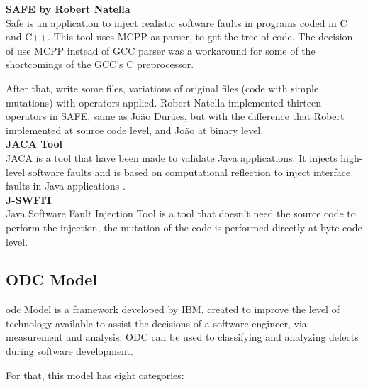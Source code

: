 \textbf{SAFE by Robert Natella}\\

Safe is an application to inject realistic software faults in programs coded in C and C++.
This tool uses MCPP as parser, to get the tree of code. The decision of use MCPP instead of GCC parser was a workaround for some of the shortcomings of the GCC's C preprocessor.

After that, write some files, variations of original files (code with simple mutations) with operators applied.
Robert Natella implemented thirteen operators in SAFE, same as João Durães\cite{duraes2006emulation}, but with the difference that Robert implemented at source code level, and João at binary level.\\


\textbf{JACA Tool}\\

JACA\cite{regina2003jaca} is a tool that have been made to validate Java applications. It injects high-level software faults and is based on computational reflection to inject interface faults in Java applications
\cite{martins2002jaca}. \\

\textbf{J-SWFIT} \\

Java Software Fault Injection Tool\cite{sanches2011j} is a tool that doesn't need the source code to perform the injection, the mutation of the code is performed directly at byte-code level.

\clearpage
\subsection{ODC Model}
\ac{odc}\cite{bridge1998orthogonal} Model is a framework developed by IBM\cite{chillarege2004orthogonal}, created to improve the level of technology available to assist the decisions of a software engineer, via measurement and analysis.
ODC can be used to classifying and analyzing defects during software development.

For that, this model has eight categories:

